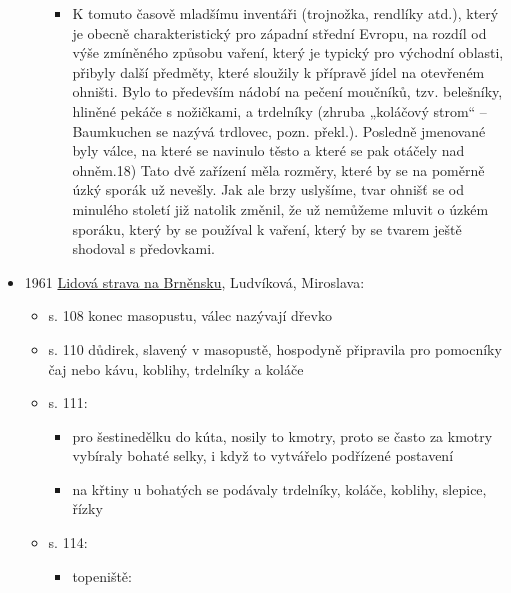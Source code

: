 \begin{itemize}
\begin{itemize}
    \begin{itemize}
    \tightlist
    \item
      K tomuto časově mladšímu inventáři (trojnožka, rendlíky atd.),
      který je obecně charakteristický pro západní střední Evropu, na
      rozdíl od výše zmíněného způsobu vaření, který je typický pro
      východní oblasti, přibyly další předměty, které sloužily k
      přípravě jídel na otevřeném ohništi. Bylo to především nádobí na
      pečení moučníků, tzv. belešníky, hliněné pekáče s nožičkami, a
      trdelníky (zhruba „koláčový strom`` -- Baumkuchen se nazývá
      trdlovec, pozn. překl.). Posledně jmenované byly válce, na které
      se navinulo těsto a které se pak otáčely nad ohněm.18) Tato dvě
      zařízení měla rozměry, které by se na poměrně úzký sporák už
      nevešly. Jak ale brzy uslyšíme, tvar ohnišť se od minulého století
      již natolik změnil, že už nemůžeme mluvit o úzkém sporáku, který
      by se používal k vaření, který by se tvarem ještě shodoval s
      předovkami.
    \end{itemize}
  \end{itemize}
\item
  1961
  \href{https://ceskadigitalniknihovna.cz/view/uuid:aab22200-ca09-11ec-af1b-005056827e51?page=uuid:879b9f5b-9287-4f6f-9958-eca21704f1b6&fulltext=trdeln\%C3\%ADk\%20OR\%20trdeln\%C3\%ADky\%20OR\%20trdeln\%C3\%ADku\%20&source=mzk}{Lidová
  strava na Brněnsku}, Ludvíková, Miroslava:

  \begin{itemize}
  \tightlist
  \item
    s. 108 konec masopustu, válec nazývají dřevko
  \item
    s. 110 důdirek, slavený v masopustě, hospodyně připravila pro
    pomocníky čaj nebo kávu, koblihy, trdelníky a koláče
  \item
    s. 111:

    \begin{itemize}
    \tightlist
    \item
      pro šestinedělku do kúta, nosily to kmotry, proto se často za
      kmotry vybíraly bohaté selky, i když to vytvářelo podřízené
      postavení
    \item
      na křtiny u bohatých se podávaly trdelníky, koláče, koblihy,
      slepice, řízky
    \end{itemize}
  \item
    s. 114:

    \begin{itemize}
    \tightlist
    \item
      topeniště:


\end{itemize}
\end{itemize}
\end{itemize}
